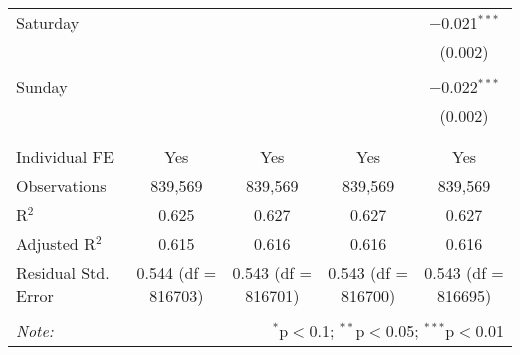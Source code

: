 \documentclass[
]{article}
\begin{document}
\begin{table}[!htbp]
{\begin{tabular}{@{\extracolsep{5pt}}lcccc}
 Saturday &  &  &  & $-$0.021$^{***}$ \\ 
  &  &  &  & (0.002) \\ 
  & & & & \\ 
 Sunday &  &  &  & $-$0.022$^{***}$ \\ 
  &  &  &  & (0.002) \\ 
  & & & & \\ 
\hline \\[-1.8ex] 
Individual FE & Yes & Yes & Yes & Yes \\ 
Observations & 839,569 & 839,569 & 839,569 & 839,569 \\ 
R$^{2}$ & 0.625 & 0.627 & 0.627 & 0.627 \\ 
Adjusted R$^{2}$ & 0.615 & 0.616 & 0.616 & 0.616 \\ 
Residual Std. Error & 0.544 (df = 816703) & 0.543 (df = 816701) & 0.543 (df = 816700) & 0.543 (df = 816695) \\ 
\hline 
\hline \\[-1.8ex] 
\textit{Note:}  & \multicolumn{4}{r}{$^{*}$p$<$0.1; $^{**}$p$<$0.05; $^{***}$p$<$0.01} \\ 
\end{tabular}
} 
\end{table} 
\newpage
\end{document}
